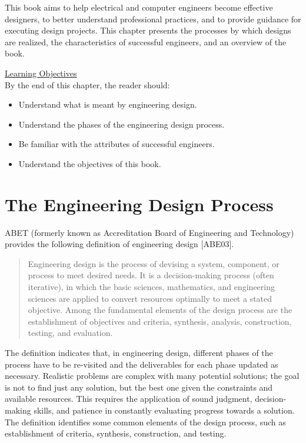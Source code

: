 This book aims to help electrical and computer engineers become
effective designers, to better understand professional practices, and to
provide guidance for executing design projects. This chapter presents
the processes by which designs are realized, the characteristics of
successful engineers, and an overview of the book.

\underline{Learning Objectives} \\
By the end of this chapter, the reader should:
\begin{itemize}
\itemsep0em 
\item Understand what is meant by engineering design.
\item  Understand the phases of the engineering design process.
\item  Be familiar with the attributes of successful engineers.
\item  Understand the objectives of this book.
\end{itemize}

\section{The Engineering Design Process}

ABET (formerly known as Accreditation Board of Engineering and
Technology) provides the following definition of engineering design
{[}ABE03{]}.

\begin{quote}
Engineering design is the process of devising a system, component, or
process to meet desired needs. It is a decision-making process (often
iterative), in which the basic sciences, mathematics, and engineering
sciences are applied to convert resources optimally to meet a stated
objective. Among the fundamental elements of the design process are the
establishment of objectives and criteria, synthesis, analysis,
construction, testing, and evaluation.
\end{quote}

The definition indicates that, in engineering design, different phases
of the process have to be re-visited and the deliverables for each phase
updated as necessary. Realistic problems are complex with many potential
solutions; the goal is not to find just any solution, but the best one
given the constraints and available resources. This requires the
application of sound judgment, decision-making skills, and patience in
constantly evaluating progress towards a solution. The definition
identifies some common elements of the design process, such as
establishment of criteria, synthesis, construction, and testing.

